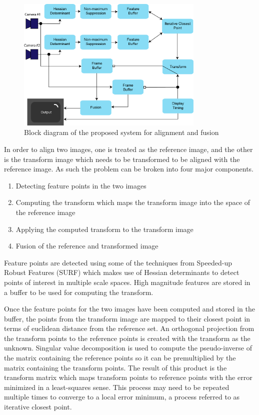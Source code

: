 \documentclass{article}
\begin{document}
\begin{figure}[h]
	\centering
	\includegraphics[width=0.8\textwidth]{figures/block/blockdiagram}
	\caption{Block diagram of the proposed system for alignment and fusion}
	\label{fig_block_diagram}
\end{figure}

In order to align two images, one is treated as the reference image, and the other is the transform image which needs to be transformed to be aligned with the reference image. As such the problem can be broken into four major components. 

\begin{enumerate}
	\item Detecting feature points in the two images
	\item Computing the transform which maps the transform image into the space of the reference image
	\item Applying the computed transform to the transform image
	\item Fusion of the reference and transformed image
\end{enumerate}

Feature points are detected using some of the techniques from Speeded-up Robust Features (SURF) which makes use of Hessian determinants to detect points of interest in multiple scale spaces. High magnitude features are stored in a buffer to be used for computing the transform.

Once the feature points for the two images have been computed and stored in the buffer, the points from the transform image are mapped to their closest point in terms of euclidean distance from the reference set. An orthogonal projection from the transform points to the reference points is created with the transform as the unknown. Singular value decomposition is used to compute the pseudo-inverse of the matrix containing the reference points so it can be premultiplied by the matrix containing the transform points. The result of this product is the transform matrix which maps transform points to reference points with the error minimized in a least-squares sense. This process may need to be repeated multiple times to converge to a local error minimum, a process referred to as iterative closest point.
\end{document}
